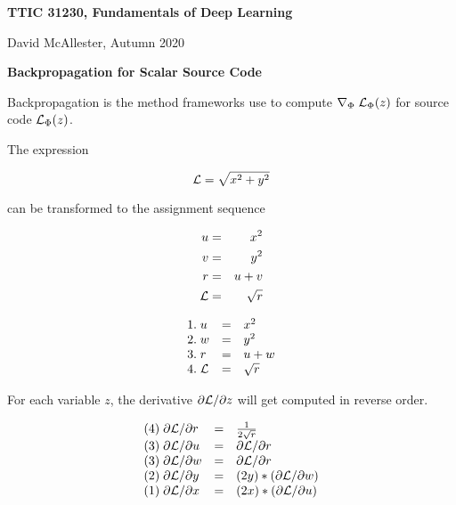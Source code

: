 




{\Huge
  
  \centerline{\bf TTIC 31230, Fundamentals of Deep Learning}
  \bigskip
  \centerline{David McAllester, Autumn 2020}
  \vfill
  \vfill
  \centerline{\bf Backpropagation for Scalar Source Code}
  \vfill
  \vfill


Backpropagation is the method frameworks use to compute $\nabla_\Phi\;{\cal L}_\Phi(z)$
for source code ${\cal L}_\Phi(z)$.


The expression

\vfill
{\color{red} $${\cal L} = \sqrt{x^2 + y^2}$$}

\vfill
can be transformed to the assignment sequence

{\color{red}
\vfill
\begin{eqnarray*}
  u & = & x^2  \\
  v & = & y^2 \\
  r & =& u + v \\
  {\cal L} & = & \sqrt{r}
\end{eqnarray*}
}

\vspace{-1ex}
{\color{red}
$$\begin{array}{lcl}
 1.\;u & = & x^2  \\
 2.\;w & = & y^2 \\
 3.\;r & =& u + w \\
  4.\;{\cal L} & = & \sqrt{r}
\end{array}$$
}

\vfill
For each variable $z$, the derivative $\partial {\cal L}/\partial z$ will get computed in reverse order.

\vfill
{\color{red}
$$\begin{array}{lcl}
(4)\; \partial{\cal L}/\partial r & = & \frac{1}{2\sqrt{r}} \\
(3)\; \partial{\cal L}/\partial u & = & \partial {\cal L}/\partial r \\
(3)\; \partial{\cal L}/\partial w & = & \partial {\cal L}/\partial r\\
(2)\; \partial{\cal L}/\partial y & = &  (2y) * (\partial {\cal L}/\partial w) \\
(1)\; \partial{\cal L}/\partial x & = & (2x) * (\partial {\cal L}/\partial u)
\end{array}$$
}

}

